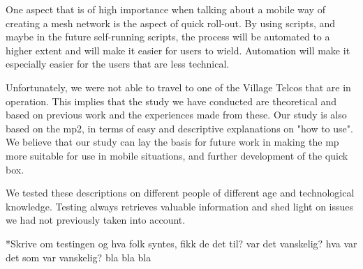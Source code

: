 One aspect that is of high importance when talking about a mobile way of creating a mesh network is the aspect of quick roll-out. By using scripts, and maybe in the future self-running scripts, the process will be automated to a higher extent and will make it easier for users to wield. Automation will make it especially easier for the users that are less technical. 

Unfortunately, we were not able to travel to one of the Village Telcos that are in operation. This implies that the study we have conducted are theoretical and based on previous work and the experiences made from these. Our study is also based on the \gls{mp2}, in terms of easy and descriptive explanations on "how to use". We believe that our study can lay the basis for future work in making the \gls{mp} more suitable for use in mobile situations, and further development of the \gls{quick} box. 

We tested these descriptions on different people of different age and technological knowledge. Testing always retrieves valuable information and shed light on issues we had not previously taken into account. 

*Skrive om testingen og hva folk syntes, fikk de det til? var det vanskelig? hva var det som var vanskelig? bla bla bla





 



